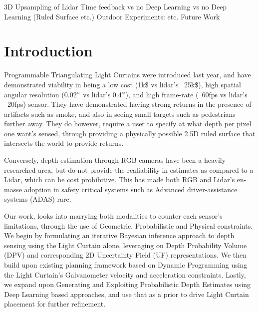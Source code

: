 \documentclass[review]{cvpr}
\begin{document}
      3D Upsampling of Lidar
      Time feedback vs no
      Deep Learning vs no Deep Learning (Ruled Surface etc.)
Outdoor Experiments:
   etc.
Future Work
\fi


\section{Introduction}

Programmable Triangulating Light Curtains were introduced last year, and have demonstrated viability in being a low cost (1k\$ vs lidar's ~25k\$), high spatial angular resolution (0.02$\degree$ vs lidar's  0.4$\degree$), and high frame-rate (~60fps vs lidar's ~20fps) sensor. They have demonstrated having strong returns in the presence of artifacts such as smoke, and also in seeing small targets such as pedestrians further away. They do however, require a user to specify at what depth per pixel one want's sensed, through providing a physically possible 2.5D ruled surface that intersects the world to provide returns. 

Conversely, depth estimation through RGB cameras have been a heavily researched area, but do not provide the realiability in estimates as compared to a Lidar, which can be cost prohibitive. This has made both RGB and Lidar's en-masse adoption in safety critical systems such as Advanced driver-assistance systems (ADAS) rare. 

Our work, looks into marrying both modalities to counter each sensor's limitations, through the use of Geometric, Probabilistic and Physical constraints. We begin by formulating an iterative Bayesian inference approach to depth sensing using the Light Curtain alone, leveraging on Depth Probability Volume (DPV) and corresponding 2D Uncertainty Field (UF) representations. We then build upon existing planning framework based on Dynamic Programming using the Light Curtain's Galvanometer velocity and acceleration constraints. Lastly, we expand upon Generating and Exploiting Probabilistic Depth Estimates using Deep Learning based approaches, and use that as a prior to drive Light Curtain placement for further refinement.





 

{\small


}
\end{document}
